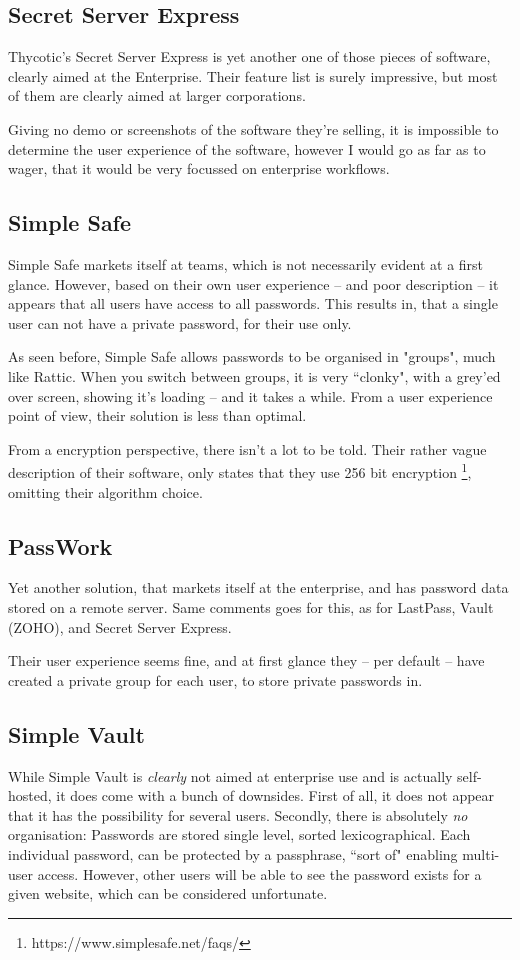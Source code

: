 		\subsection{Secret Server Express}
			Thycotic's Secret Server Express is yet another one of those pieces of software, clearly aimed at the Enterprise. Their feature list is surely impressive, but most of them are clearly aimed at larger corporations. 

			Giving no demo or screenshots of the software they're selling, it is impossible to determine the user experience of the software, however I would go as far as to wager, that it would be very focussed on enterprise workflows.

		\subsection{Simple Safe}
			Simple Safe markets itself at teams, which is not necessarily evident at a first glance. However, based on their own user experience -- and poor description -- it appears that all users have access to all passwords. This results in, that a single user can not have a private password, for their use only.

			As seen before, Simple Safe allows passwords to be organised in "groups", much like Rattic. When you switch between groups, it is very ``clonky", with a grey'ed over screen, showing it's loading -- and it takes a while. From a user experience point of view, their solution is less than optimal.

			From a encryption perspective, there isn't a lot to be told. Their rather vague description of their software, only states that they use 256 bit encryption \footnote{https://www.simplesafe.net/faqs/}, omitting their algorithm choice.


		\subsection{PassWork}
			Yet another solution, that markets itself at the enterprise, and has password data stored on a remote server. Same comments goes for this, as for LastPass, Vault (ZOHO), and Secret Server Express. 

			Their user experience seems fine, and at first glance they -- per default -- have created a private group for each user, to store private passwords in. 

		\subsection{Simple Vault}
			While Simple Vault is \emph{clearly} not aimed at enterprise use and is actually self-hosted, it does come with a bunch of downsides. First of all, it does not appear that it has the possibility for several users. Secondly, there is absolutely \emph{no} organisation: Passwords are stored single level, sorted lexicographical. Each individual password, can be protected by a passphrase, ``sort of" enabling multi-user access. However, other users will be able to see the password exists for a given website, which can be considered unfortunate.

